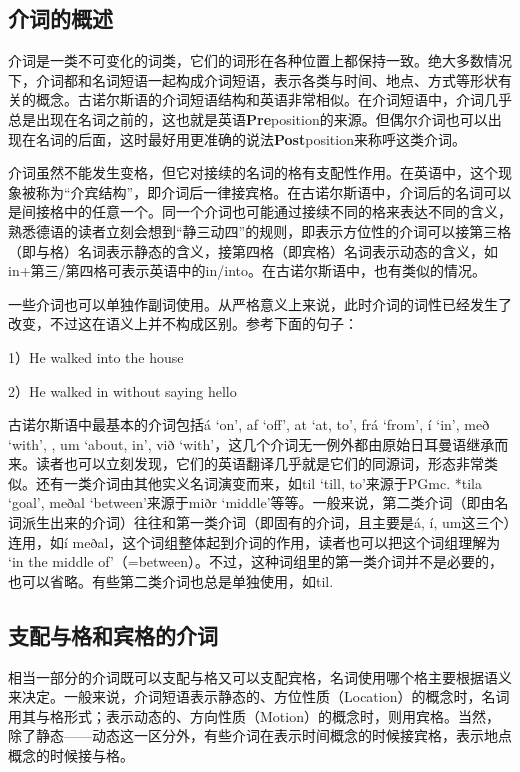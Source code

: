 \subsection{介词的概述}\label{ux4ecbux8bcdux7684ux6982ux8ff0}

介词是一类不可变化的词类，它们的词形在各种位置上都保持一致。绝大多数情况下，介词都和名词短语一起构成介词短语，表示各类与时间、地点、方式等形状有关的概念。古诺尔斯语的介词短语结构和英语非常相似。在介词短语中，介词几乎总是出现在名词之前的，这也就是英语\textbf{Pre}position的来源。但偶尔介词也可以出现在名词的后面，这时最好用更准确的说法\textbf{Post}position来称呼这类介词。

介词虽然不能发生变格，但它对接续的名词的格有支配性作用。在英语中，这个现象被称为``介宾结构''，即介词后一律接宾格。在古诺尔斯语中，介词后的名词可以是间接格中的任意一个。同一个介词也可能通过接续不同的格来表达不同的含义，熟悉德语的读者立刻会想到``静三动四''的规则，即表示方位性的介词可以接第三格（即与格）名词表示静态的含义，接第四格（即宾格）名词表示动态的含义，如in+第三/第四格可表示英语中的in/into。在古诺尔斯语中，也有类似的情况。

一些介词也可以单独作副词使用。从严格意义上来说，此时介词的词性已经发生了改变，不过这在语义上并不构成区别。参考下面的句子：

1）He walked into the house

2）He walked in without saying hello

古诺尔斯语中最基本的介词包括á `on', af `off', at `at, to', frá `from', í
`in', með `with', , um `about, in', við
`with'，这几个介词无一例外都由原始日耳曼语继承而来。读者也可以立刻发现，它们的英语翻译几乎就是它们的同源词，形态非常类似。还有一类介词由其他实义名词演变而来，如til
`till, to'来源于PGmc. *tila `goal', meðal `between'来源于miðr
`middle'等等。一般来说，第二类介词（即由名词派生出来的介词）往往和第一类介词（即固有的介词，且主要是á,
í, um这三个）连用，如í
meðal，这个词组整体起到介词的作用，读者也可以把这个词组理解为 `in the
middle
of'（=between）。不过，这种词组里的第一类介词并不是必要的，也可以省略。有些第二类介词也总是单独使用，如til.

\subsection{支配与格和宾格的介词}\label{ux652fux914dux4e0eux683cux548cux5bbeux683cux7684ux4ecbux8bcd}

相当一部分的介词既可以支配与格又可以支配宾格，名词使用哪个格主要根据语义来决定。一般来说，介词短语表示静态的、方位性质（Location）的概念时，名词用其与格形式；表示动态的、方向性质（Motion）的概念时，则用宾格。当然，除了静态------动态这一区分外，有些介词在表示时间概念的时候接宾格，表示地点概念的时候接与格。

